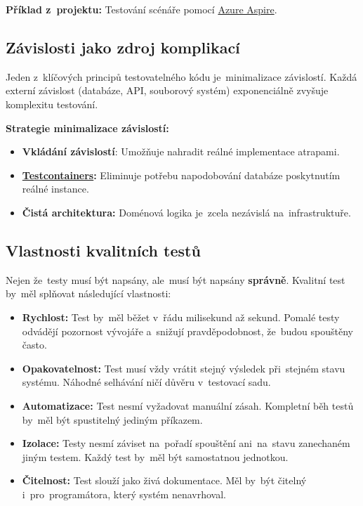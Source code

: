 \documentclass[
  master,
  program=ainfvs,
  printversion,
  figures=false,
  tables=false,
  glossaries,
  index
]{kidiplom}
\begin{document}
\textbf{Příklad z~projektu:} Testování scénáře pomocí \hyperref[par:aspire]{Azure Aspire}.

\subsection{Závislosti jako zdroj komplikací}
Jeden z~klíčových principů testovatelného kódu je~minimalizace závislostí. Každá externí závislost (databáze, API, souborový systém) exponenciálně zvyšuje komplexitu testování.


\textbf{Strategie minimalizace závislostí:}
\begin{itemize}
    \item \textbf{Vkládání závislostí}: Umožňuje nahradit reálné implementace atrapami.
    \item \textbf{\hyperref[par:testcontainers]{Testcontainers}:} Eliminuje potřebu napodobování databáze poskytnutím reálné instance.
    \item \textbf{Čistá architektura:} Doménová logika je~zcela nezávislá na~infrastruktuře.
\end{itemize}

\subsection{Vlastnosti kvalitních testů}
Nejen že~testy musí být napsány, ale~musí být napsány \textbf{správně}. Kvalitní test by~měl splňovat následující vlastnosti:


\begin{itemize}
    \item \textbf{Rychlost:} Test by~měl běžet v~řádu milisekund až sekund. Pomalé testy odvádějí pozornost vývojáře a~snižují pravděpodobnost, že~budou spouštěny často.
    \item \textbf{Opakovatelnost:} Test musí vždy vrátit stejný výsledek při~stejném stavu systému. Náhodné selhávání ničí důvěru v~testovací sadu.
    \item \textbf{Automatizace:} Test nesmí vyžadovat manuální zásah. Kompletní běh testů by~měl být spustitelný jediným příkazem.
    \item \textbf{Izolace:} Testy nesmí záviset na~pořadí spouštění ani~na~stavu zanechaném jiným testem. Každý test by~měl být samostatnou jednotkou.
    \item \textbf{Čitelnost:} Test slouží jako živá dokumentace. Měl by~být čitelný i~pro~programátora, který systém nenavrhoval.
\end{itemize}
\end{document}
